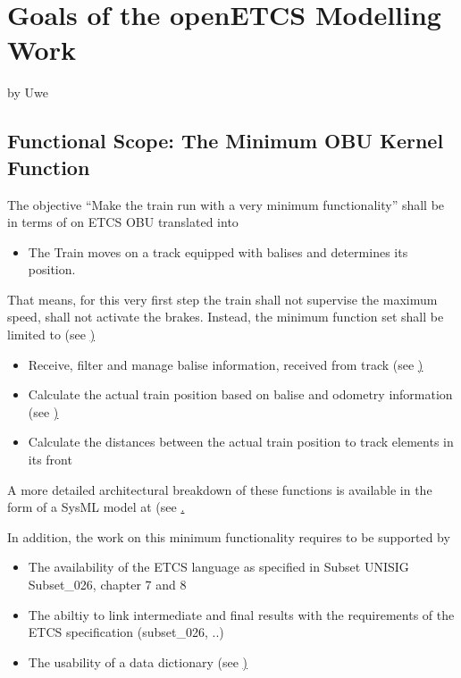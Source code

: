 \section{Goals of the openETCS Modelling Work}
by Uwe


\subsection{Functional Scope: The Minimum OBU Kernel Function}
\label{sec:FunctionalScopeTheMinimumOBUKernelFunction}

The objective “Make the train run with a very minimum functionality” shall be in terms of on ETCS OBU translated into 
\begin{itemize}
	\item The Train moves on a track equipped with balises and determines its position.
\end{itemize}

That means, for this very first step the train shall not supervise the maximum speed, shall not activate the brakes. Instead, the minimum function set shall be limited to (see \href{https://github.com/openETCS/SRS-Analysis/issues/9} ) 
\begin{itemize}
	\item Receive, filter and manage balise information, received from track (see \href{https://github.com/openETCS/SRS-Analysis/issues/12})
	\item Calculate the actual train position based on balise and odometry information (see \href{https://github.com/openETCS/SRS-Analysis/issues/8})
	\item Calculate the distances between the actual train position to track elements in its front
\end{itemize}

A more detailed architectural breakdown of these functions is available in the form of a SysML model at (see \href{https://github.com/openETCS/modeling/tree/master/model/sysml}. 

In addition, the work on this minimum functionality requires to be supported by
\begin{itemize}
	\item The availability of the ETCS language as specified in Subset UNISIG Subset\_026, chapter 7 and 8
	\item The abiltiy to link intermediate and final results with the requirements of the ETCS specification (subset\_026, ..) 
	\item The usability of a data dictionary (see \href{https://github.com/openETCS/dataDictionary} )
\end{itemize}

